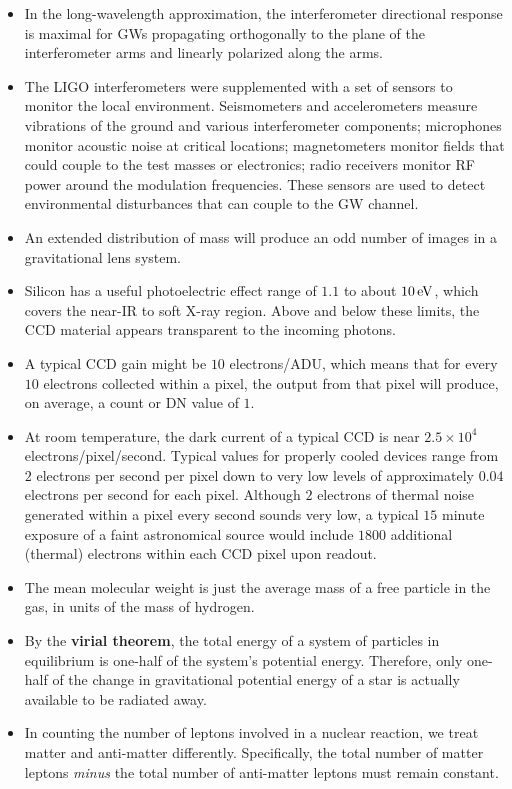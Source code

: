 \documentclass[a4paper,10pt]{article}
\begin{document}
\begin{itemize}
    \item In the long-wavelength approximation, the interferometer directional response is maximal for GWs propagating orthogonally to the plane of the interferometer arms and linearly polarized along the arms.
    \item The LIGO interferometers were supplemented with a set of sensors to monitor the local environment. Seismometers and accelerometers measure vibrations of the ground and various interferometer components; microphones monitor acoustic noise at critical locations; magnetometers monitor fields that could couple to the test masses or electronics; radio receivers monitor RF power around the modulation frequencies. These sensors are used to detect environmental disturbances that can couple to the GW channel.
    \item An extended distribution of mass will produce an odd number of images in a gravitational lens system.
    \item Silicon has a useful photoelectric effect range of $1.1$ to about $10\,{\rm eV}$, which covers the near-IR to soft X-ray region. Above and below these limits, the CCD material appears transparent to the incoming photons.
    \item A typical CCD gain might be $10$ electrons/ADU, which means that for every $10$ electrons collected within a pixel, the output from that pixel will produce, on average, a count or DN value of $1$.
    \item At room temperature, the dark current of a typical CCD is near $2.5\times10^4$ electrons/pixel/second. Typical values for properly cooled devices range from $2$ electrons per second per pixel down to very low levels of approximately $0.04$ electrons per second for each pixel. Although $2$ electrons of thermal noise generated within a pixel every second sounds very low, a typical $15$ minute exposure of a faint astronomical source would include $1800$ additional (thermal) electrons within each CCD pixel upon readout.
    \item The mean molecular weight is just the average mass of a free particle in the gas, in units of the mass of hydrogen.
    \item By the \textbf{virial theorem}, the total energy of a system of particles in equilibrium is one-half of the system's potential energy. Therefore, only one-half of the change in gravitational potential energy of a star is actually available to be radiated away.
    \item In counting the number of leptons involved in a nuclear reaction, we treat matter and anti-matter differently. Specifically, the total number of matter leptons \textit{minus} the total number of anti-matter leptons must remain constant.

\end{itemize}
\end{document}
